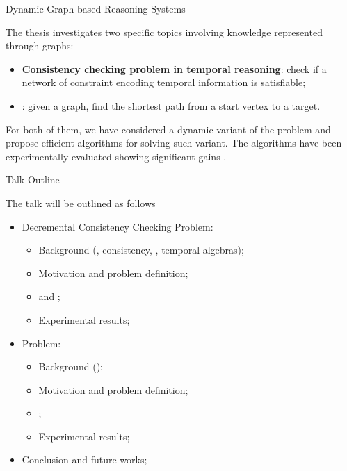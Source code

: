 \begin{frame}{Dynamic Graph-based Reasoning Systems}

    The thesis investigates two specific topics involving knowledge represented through graphs:

    \begin{itemize}
        \item \textbf{Consistency checking problem in temporal reasoning}: check if a network of constraint encoding temporal information is satisfiable;
        \item \textbf{\Pathfinding{}}: given a graph, find the shortest path from a start vertex to a target.
    \end{itemize}

    For both of them, we have considered a dynamic variant of the problem and propose efficient algorithms for solving such variant. 
    The algorithms have been experimentally evaluated showing significant gains \wrt{} \stateofart{}.
\end{frame}

\begin{frame}{Talk Outline}

    The talk will be outlined as follows
    \begin{itemize}
        \item Decremental Consistency Checking Problem:
        \begin{itemize}
            \item Background (\CSPName{}, consistency, \tlGraphName{}, temporal algebras);
            \item Motivation and problem definition;
            \item \DPASATAlgorithmName{} and \DOHSATAlgorithmName{};
            \item Experimental results;
        \end{itemize}
        \item \SAPFEC{} Problem:
        \begin{itemize}
            \item Background (\CPD{});
            \item Motivation and problem definition;
            \item \CPDSearch{};
            \item Experimental results;
        \end{itemize}
        \item Conclusion and future works;
    \end{itemize}
\end{frame}